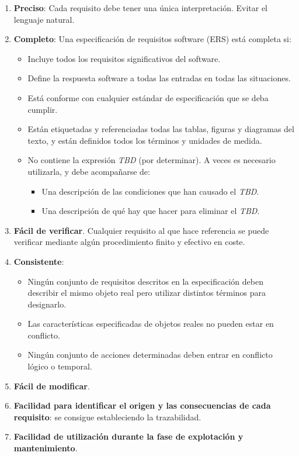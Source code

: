 \begin{enumerate}
    \item \textbf{Preciso}: Cada requisito debe tener una única interpretación. Evitar el lenguaje natural.
    \item \textbf{Completo}: Una especificación de requisitos software (ERS) está completa si:
          \begin{itemize}
              \item Incluye todos los requisitos significativos del software.
              \item Define la respuesta software a todas las entradas en todas las situaciones.
              \item Está conforme con cualquier estándar de especificación que se deba cumplir.
              \item Están etiquetadas y referenciadas todas las tablas, figuras y diagramas del texto, y están definidos todos los términos y unidades de medida.
              \item No contiene la expresión \textit{TBD} (por determinar). A veces es necesario utilizarla, y debe acompañarse de:
                    \begin{itemize}
                        \item Una descripción de las condiciones que han causado el \textit{TBD}.
                        \item Una descripción de qué hay que hacer para eliminar el \textit{TBD}.
                    \end{itemize}
          \end{itemize}
    \item \textbf{Fácil de verificar}. Cualquier requisito al que hace referencia se puede verificar mediante algún procedimiento finito y efectivo en coste.
    \item \textbf{Consistente}: %
          \begin{itemize}
              \item Ningún conjunto de requisitos descritos en la especificación deben describir el mismo objeto real pero utilizar distintos términos para designarlo.
              \item Las características especificadas de objetos reales no pueden estar en conflicto.
              \item Ningún conjunto de acciones determinadas deben entrar en conflicto lógico o temporal.
          \end{itemize}
    \item \textbf{Fácil de modificar}.

    \item \textbf{Facilidad para identificar el origen y las consecuencias de cada requisito}: se consigue estableciendo la trazabilidad.

    \item \textbf{Facilidad de utilización durante la fase de explotación y mantenimiento}. %

\end{enumerate}





